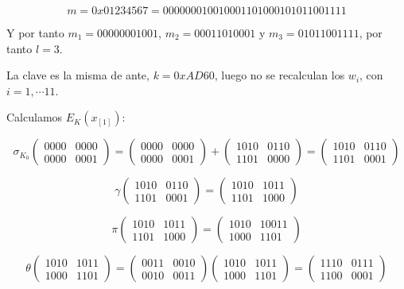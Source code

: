 \documentclass[a4paper]{article}
\begin{document}
$$m = 0x01234567 = 0000 0001 0010 0011 0100 0101 0110 0111 1$$

Y por tanto $m_1=0000 0001 001$, $m_2=0 0011 0100 01$ y $m_3=01 0110 0111 1$, por tanto $l=3$.

La clave es la misma de ante, $k=0xAD60$, luego no se recalculan los $w_i$, con $i = 1, \cdots 11$.

Calculamos $E_K(x_{[1]})$:

$$\sigma_{K_0} \begin{pmatrix} 0000 & 0000 \\ 0000 & 0001 \end{pmatrix} = \begin{pmatrix} 0000 & 0000 \\ 0000 & 0001 \end{pmatrix} + \begin{pmatrix} 1010 & 0110 \\ 1101 & 0000 \end{pmatrix} = \begin{pmatrix} 1010 & 0110 \\ 1101 & 0001 \end{pmatrix}$$

$$\gamma \begin{pmatrix} 1010 & 0110 \\ 1101 & 0001 \end{pmatrix} = \begin{pmatrix} 1010 & 1011 \\ 1101 & 1000 \end{pmatrix}$$

$$\pi \begin{pmatrix} 1010 & 1011 \\ 1101 & 1000 \end{pmatrix} = \begin{pmatrix} 1010 & 10011 \\ 1000 & 1101 \end{pmatrix}$$

$$\theta \begin{pmatrix} 1010 & 1011 \\ 1000 & 1101 \end{pmatrix} = \begin{pmatrix} 0011 & 0010 \\ 0010 & 0011 \end{pmatrix}\begin{pmatrix} 1010 & 1011 \\ 1000 & 1101 \end{pmatrix} = \begin{pmatrix} 1110 & 0111 \\ 1100 & 0001 \end{pmatrix}$$
\end{document}
